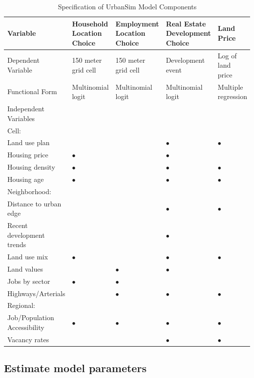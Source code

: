 \begin{table}[htp]
\caption{Specification of UrbanSim Model Components}
\label{tab:components}
\begin{tabular}{p{5cm}p{2cm}p{2cm}p{2.5cm}p{2cm}}
\addlinespace
\toprule[1.5pt]
Variable & Household Location Choice & Employment Location Choice & Real Estate Development Choice & Land Price \\
\midrule
Dependent Variable & 150 meter grid cell & 150 meter grid cell & Development event & Log of land price \\
\midrule
Functional Form & Multinomial logit & Multinomial logit & Multinomial logit & Multiple regression \\
\midrule
Independent Variables & & & & \\
\midrule
\addlinespace
Cell: & &  & & \\
\midrule
Land use plan & & & $\bullet$ & $\bullet$ \\
Housing price & $\bullet$ & & $\bullet$ & \\
Housing density & $\bullet$ & & $\bullet$ & $\bullet$ \\
Housing age & $\bullet$ & & $\bullet$ & $\bullet$ \\
\addlinespace
Neighborhood: & & & & \\
\midrule
Distance to urban edge & & & $\bullet$ & $\bullet$ \\
Recent development trends   & & & $\bullet$ &  \\
Land use mix & $\bullet$ & & $\bullet$ & $\bullet$ \\
Land values & & $\bullet$ & $\bullet$ & \\
Jobs by sector  & $\bullet$ & $\bullet$ & & \\
Highways/Arterials  & & $\bullet$ & $\bullet$ & $\bullet$ \\
\addlinespace
Regional:   & & & & \\
\midrule
Job/Population Accessibility & $\bullet$ & $\bullet$ & $\bullet$ & $\bullet$ \\
Vacancy rates   & & & $\bullet$ & $\bullet$ \\
\bottomrule[1.5pt]
\end{tabular}
\end{table}


\subsection{Estimate model parameters}

